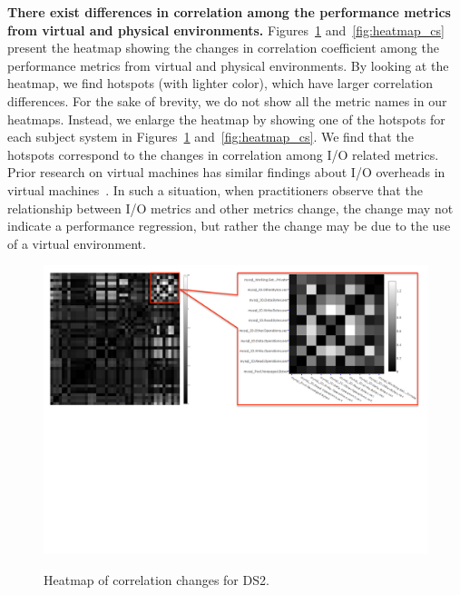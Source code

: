\noindent \textbf{There exist differences in correlation among the performance metrics from virtual and physical environments.} Figures~\ref{fig:heatmap} and~\ref{fig:heatmap_cs} present the heatmap showing the changes in correlation coefficient among the performance metrics from virtual and physical environments. By looking at the heatmap, we find hotspots (with lighter color), which have larger correlation differences. For the sake of brevity, we do not show all the metric names in our heatmaps. Instead, we enlarge the heatmap by showing one of the hotspots for each subject system in Figures~\ref{fig:heatmap} and~\ref{fig:heatmap_cs}. We find that the hotspots correspond to the changes in correlation among I/O related metrics. Prior research on virtual machines has similar findings about I/O overheads in virtual machines~\cite{menon2005diagnosing,kraft2011io}. In such a situation, when practitioners observe that the relationship between I/O metrics and other metrics change, the change may not indicate a performance regression, but rather the change may be due to the use of a virtual environment.

\noindent{}


\begin{figure}[tbh]
	\centering
	{\includegraphics[width=1.0\textwidth]{figures/heat}}
	\caption{Heatmap of correlation changes for DS2.}
	\label{fig:heatmap}
\end{figure}


